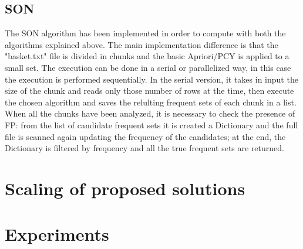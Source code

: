 \documentclass[14pt]{extarticle}
\begin{document}
\subsection{SON}
The SON algorithm has been implemented in order to compute with both the algorithms explained above. The main implementation difference is that the "basket.txt" file is divided in chunks and the basic Apriori/PCY is applied to a small set. The execution can be done in a serial or parallelized way, in this case the execution is performed sequentially. In the serial version, it takes in input the size of the chunk and reads only those number of rows at the time, then execute the chosen algorithm and saves the relulting frequent sets of each chunk in a list. When all the chunks have been analyzed, it is necessary to check the presence of FP: from the list of candidate frequent sets it is created a Dictionary and the full file is scanned again updating the frequency of the candidates; at the end, the Dictionary is filtered by frequency and all the true frequent sets are returned.

\section{Scaling of proposed solutions}
\section{Experiments}
\end{document}
